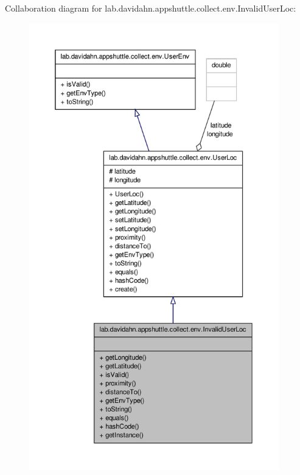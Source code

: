 \-Collaboration diagram for lab.\-davidahn.\-appshuttle.\-collect.\-env.\-Invalid\-User\-Loc\-:
\nopagebreak
\begin{figure}[H]
\begin{center}
\leavevmode
\includegraphics[height=550pt]{classlab_1_1davidahn_1_1appshuttle_1_1collect_1_1env_1_1_invalid_user_loc__coll__graph}
\end{center}
\end{figure}
